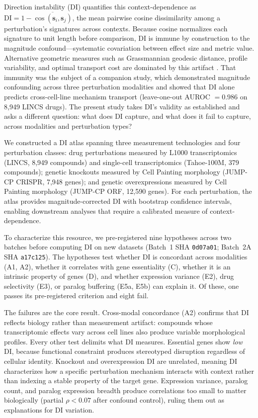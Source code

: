 \documentclass[11pt]{article}
\begin{document}
Direction instability (DI) quantifies this context-dependence as
$\mathrm{DI} = 1 - \overline{\cos(\mathbf{s}_i, \mathbf{s}_j)}$, the
mean pairwise cosine dissimilarity among a perturbation's signatures
across contexts.  Because cosine normalizes each signature to unit length before
comparison, DI is immune by construction to the magnitude
confound---systematic covariation between effect size and metric value.
Alternative geometric measures such as Grassmannian geodesic distance,
profile variability, and optimal transport cost are dominated by this
artifact \citep{tower2026confound}.  That immunity was the subject
of a companion study, which demonstrated magnitude confounding across
three perturbation modalities and showed that DI alone predicts
cross-cell-line mechanism transport (leave-one-out AUROC $= 0.986$ on
8{,}949 LINCS drugs).  The present study takes DI's validity as
established and asks a different question: what does DI capture, and
what does it fail to capture, across modalities and perturbation types?

We constructed a DI atlas spanning three measurement technologies and
four perturbation classes: drug perturbations measured by L1000
transcriptomics (LINCS, 8{,}949 compounds) and single-cell
transcriptomics (Tahoe-100M, 379 compounds); genetic knockouts measured
by Cell Painting morphology (JUMP-CP CRISPR, 7{,}948 genes); and
genetic overexpressions measured by Cell Painting morphology (JUMP-CP
ORF, 12{,}590 genes).  For each perturbation, the atlas provides
magnitude-corrected DI with bootstrap confidence intervals, enabling
downstream analyses that require a calibrated measure of
context-dependence.

To characterize this resource, we pre-registered nine hypotheses across
two batches before computing DI on new datasets (Batch~1 SHA
\texttt{0d07a01}; Batch~2A SHA \texttt{a17c125}).  The hypotheses test
whether DI is concordant across modalities (A1, A2), whether it
correlates with gene essentiality (C), whether it is an intrinsic
property of genes (D), and whether expression variance (E2), drug
selectivity (E3), or paralog buffering (E5a, E5b) can explain it.  Of these, one
passes its pre-registered criterion and eight fail.

The failures are the core result.  Cross-modal concordance (A2) confirms
that DI reflects biology rather than measurement artifact: compounds
whose transcriptomic effects vary across cell lines also produce
variable morphological profiles.  Every other test delimits what DI
measures.  Essential genes show \emph{low} DI, because functional
constraint produces stereotyped disruption regardless of cellular
identity.  Knockout and overexpression DI are unrelated, meaning DI
characterizes how a specific perturbation mechanism interacts with
context rather than indexing a stable property of the target gene.
Expression variance, paralog count, and paralog expression breadth
produce correlations too small to matter biologically (partial
$\rho < 0.07$ after confound control), ruling them out as explanations
for DI variation.
\end{document}

